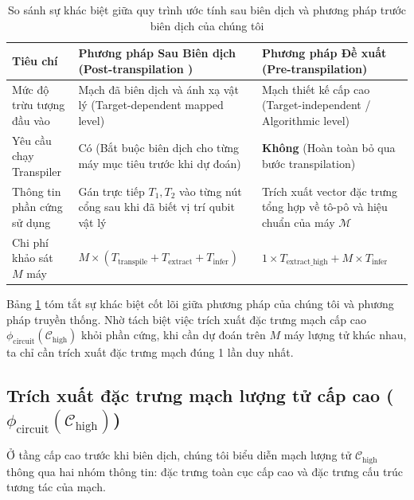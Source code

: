 \documentclass[11pt, a4paper]{article}
\begin{document}
\begin{table}[htbp]
\centering
\caption{So sánh sự khác biệt giữa quy trình ước tính sau biên dịch \cite{ma2025understanding} và phương pháp trước biên dịch của chúng tôi}
\label{tab:comparison_workflow}
\begin{tabularx}{\textwidth}{l X X}
\toprule
\textbf{Tiêu chí} & \textbf{Phương pháp Sau Biên dịch (Post-transpilation \cite{ma2025understanding})} & \textbf{Phương pháp Đề xuất (Pre-transpilation)} \\
\midrule
Mức độ trừu tượng đầu vào & Mạch đã biên dịch và ánh xạ vật lý (Target-dependent mapped level) & Mạch thiết kế cấp cao (Target-independent / Algorithmic level) \\
Yêu cầu chạy Transpiler & Có (Bắt buộc biên dịch cho từng máy mục tiêu trước khi dự đoán) & \textbf{Không} (Hoàn toàn bỏ qua bước transpilation) \\
Thông tin phần cứng sử dụng & Gán trực tiếp $T_1, T_2$ vào từng nút cổng sau khi đã biết vị trí qubit vật lý & Trích xuất vector đặc trưng tổng hợp về tô-pô và hiệu chuẩn của máy $\mathcal{M}$ \\
Chi phí khảo sát $M$ máy & $M \times (T_{\text{transpile}} + T_{\text{extract}} + T_{\text{infer}})$ & $1 \times T_{\text{extract\_high}} + M \times T_{\text{infer}}$ \\
\bottomrule
\end{tabularx}
\end{table}

Bảng \ref{tab:comparison_workflow} tóm tắt sự khác biệt cốt lõi giữa phương pháp của chúng tôi và phương pháp truyền thống. Nhờ tách biệt việc trích xuất đặc trưng mạch cấp cao $\phi_{\text{circuit}}(\mathcal{C}_{\text{high}})$ khỏi phần cứng, khi cần dự đoán trên $M$ máy lượng tử khác nhau, ta chỉ cần trích xuất đặc trưng mạch đúng 1 lần duy nhất.

\subsection{Trích xuất đặc trưng mạch lượng tử cấp cao (\texorpdfstring{$\phi_{\text{circuit}}(\mathcal{C}_{\text{high}})$}{phi\_circuit(C\_high)})}
Ở tầng cấp cao trước khi biên dịch, chúng tôi biểu diễn mạch lượng tử $\mathcal{C}_{\text{high}}$ thông qua hai nhóm thông tin: đặc trưng toàn cục cấp cao và đặc trưng cấu trúc tương tác của mạch.
\end{document}
